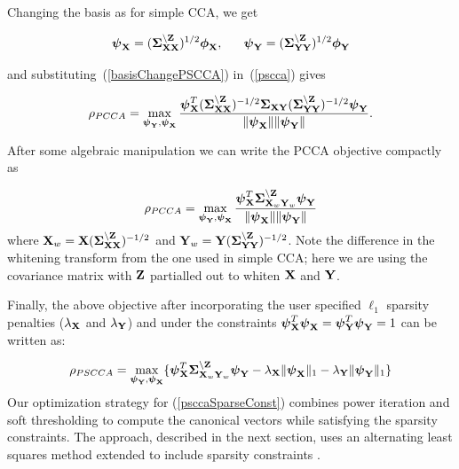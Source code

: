 \documentclass{llncs}
\newcommand{\X}{{\bf X}}
\newcommand{\Y}{{\bf Y}}
\newcommand{\Z}{{\bf Z}}
\newcommand{\bs}{\boldsymbol}
\begin{document}
Changing the basis as for simple CCA, we get

\begin{equation}
\label{basisChangePSCCA}
\bs\psi_{\X} = (\bs\Sigma_{\X\X}^{\backslash \Z})^{1/2}\bs\phi_{\X}, \;\;\;\;\;\;   \bs\psi_{\Y} = (\bs\Sigma_{\Y\Y}^{\backslash \Z})^{1/2}\bs\phi_{\Y} 
\end{equation}

and substituting~(\ref{basisChangePSCCA}) in~(\ref{pscca}) gives

\begin{equation}
\label{subsPSCCA}
\rho_{PCCA}= \max_{{\bs\psi_{\Y}}, {\bs\psi_{\X}}} \frac{\bs\psi_{\X}^T (\bs\Sigma_{\X\X}^{\backslash \Z})^{-1/2}\bs\Sigma_{\X\Y}(\bs\Sigma_{\Y\Y}^{\backslash \Z})^{-1/2}\bs\psi_{\Y}}{\|\bs\psi_{\X}\| \|\bs\psi_{\Y}\|} .
\end{equation}

After some algebraic manipulation we can write the PCCA objective compactly as

\begin{equation}
\label{psccacompact}
\rho_{PCCA}=\max_{{\bs\psi_{\Y}}, {\bs\psi_{\X}}} \frac{\bs\psi_{\X}^T \bs\Sigma_{\X_w\Y_w}^{\backslash \Z}\bs\psi_{\Y}}{\|\bs\psi_{\X}\| \|\bs\psi_{\Y}\|}
\end{equation}
where $\X_w=\X(\bs\Sigma_{\X\X}^{\backslash \Z})^{-1/2}$ and
$\Y_w=\Y(\bs\Sigma_{\Y\Y}^{\backslash \Z})^{-1/2}$. Note the
difference in the whitening transform from the one used in simple CCA;
here we are using the covariance matrix with $\Z$ partialled out
to whiten $\X$ and $\Y$.


Finally, the above objective after incorporating the user specified $\ell_1$ sparsity penalties ($\lambda_{\X}$ and $\lambda_{\Y}$) and under the constraints $\bs\psi_{\X}^T\bs\psi_{\X}=\bs\psi_{\Y}^T\bs\psi_{\Y}=1$ can be written as:

\begin{equation}
\label{psccaSparseConst}
\rho_{PSCCA}=\max_{{\bs\psi_{\Y}}, {\bs\psi_{\X}}} \{ \bs\psi_{\X}^T \bs\Sigma_{\X_w\Y_w}^{\backslash \Z}\bs\psi_{\Y} - \lambda_{\X}\|\bs\psi_{\X}\|_1 - \lambda_{\Y}\|\bs\psi_{\Y}\|_1\}
\end{equation}
Our optimization strategy for (\ref{psccaSparseConst}) combines power
iteration and soft thresholding to compute the canonical vectors while
satisfying  the sparsity constraints.  The approach, described in the next
section, uses an alternating least squares method
\cite{golub} extended to include sparsity constraints
\cite{cichocki}. 
\end{document}
